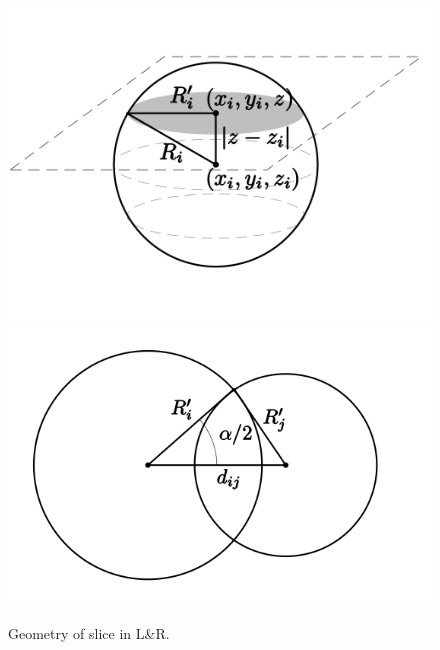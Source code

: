 \documentclass[a4paper,11pt]{article}
\begin{document}
\begin{figure}
\includegraphics{fig/lnr_slice}
\includegraphics{fig/lnr_circles}
\caption{Geometry of slice in L\&R.\label{fig:slice}}
\end{figure}
\end{document}
